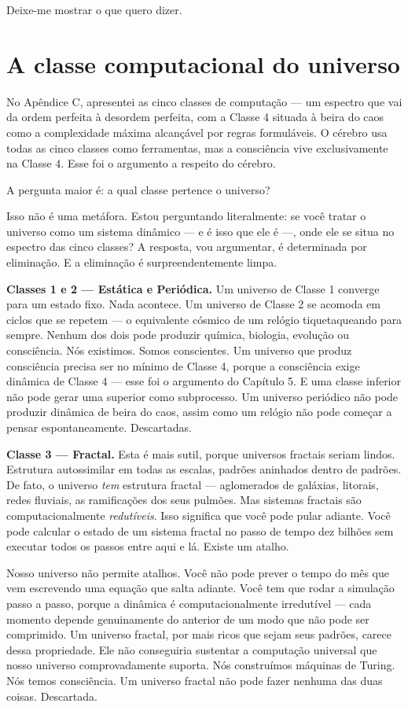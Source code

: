 \documentclass[11pt, twoside, openright]{book}
\begin{document}
Deixe-me mostrar o que quero dizer.


\section*{A classe computacional do universo}

No Apêndice C, apresentei as cinco classes de computação --- um espectro que vai da ordem perfeita à desordem perfeita, com a Classe 4 situada à beira do caos como a complexidade máxima alcançável por regras formuláveis. O cérebro usa todas as cinco classes como ferramentas, mas a consciência vive exclusivamente na Classe 4. Esse foi o argumento a respeito do cérebro.

A pergunta maior é: a qual classe pertence o universo?

Isso não é uma metáfora. Estou perguntando literalmente: se você tratar o universo como um sistema dinâmico --- e é isso que ele é ---, onde ele se situa no espectro das cinco classes? A resposta, vou argumentar, é determinada por eliminação. E a eliminação é surpreendentemente limpa.

\textbf{Classes 1 e 2 --- Estática e Periódica.} Um universo de Classe 1 converge para um estado fixo. Nada acontece. Um universo de Classe 2 se acomoda em ciclos que se repetem --- o equivalente cósmico de um relógio tiquetaqueando para sempre. Nenhum dos dois pode produzir química, biologia, evolução ou consciência. Nós existimos. Somos conscientes. Um universo que produz consciência precisa ser no mínimo de Classe 4, porque a consciência exige dinâmica de Classe 4 --- esse foi o argumento do Capítulo 5. E uma classe inferior não pode gerar uma superior como subprocesso. Um universo periódico não pode produzir dinâmica de beira do caos, assim como um relógio não pode começar a pensar espontaneamente. Descartadas.

\textbf{Classe 3 --- Fractal.} Esta é mais sutil, porque universos fractais seriam lindos. Estrutura autossimilar em todas as escalas, padrões aninhados dentro de padrões. De fato, o universo \textit{tem} estrutura fractal --- aglomerados de galáxias, litorais, redes fluviais, as ramificações dos seus pulmões. Mas sistemas fractais são computacionalmente \textit{redutíveis}. Isso significa que você pode pular adiante. Você pode calcular o estado de um sistema fractal no passo de tempo dez bilhões sem executar todos os passos entre aqui e lá. Existe um atalho.

Nosso universo não permite atalhos. Você não pode prever o tempo do mês que vem escrevendo uma equação que salta adiante. Você tem que rodar a simulação passo a passo, porque a dinâmica é computacionalmente irredutível --- cada momento depende genuinamente do anterior de um modo que não pode ser comprimido. Um universo fractal, por mais ricos que sejam seus padrões, carece dessa propriedade. Ele não conseguiria sustentar a computação universal que nosso universo comprovadamente suporta. Nós construímos máquinas de Turing. Nós temos consciência. Um universo fractal não pode fazer nenhuma das duas coisas. Descartada.
\end{document}
